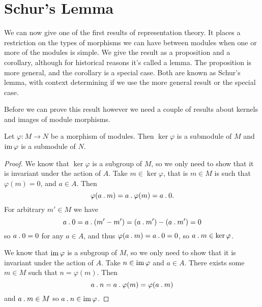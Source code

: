 \section{Schur's Lemma}
We can now give one of the first results of representation theory.
It places a restriction on the types of morphisms we can have between modules when one or more of the modules is simple.
We give the result as a proposition and a corollary, although for historical reasons it's called a lemma.
The proposition is more general, and the corollary is a special case.
Both are known as Schur's lemma, with context determining if we use the more general result or the special case.

Before we can prove this result however we need a couple of results about kernels and images of module morphisms.

\begin{lma}{}{}
    Let \(\varphi \colon M \to N\) be a morphism of modules.
    Then \(\ker \varphi\) is a submodule of \(M\) and \(\im \varphi\) is a submodule of \(N\).
    \begin{proof}
        \Step{\(\ker \varphi\)}
        We know that \(\ker \varphi\) is a subgroup of \(M\), so we only need to show that it is invariant under the action of \(A\).
        Take \(m \in \ker \varphi\), that is \(m \in M\) is such that \(\varphi(m) = 0\), and \(a \in A\).
        Then
        \begin{equation}
            \varphi(a \mathbin{.} m) = a \mathbin{.} \varphi(m) = a \mathbin{.} 0.
        \end{equation}
        For arbitrary \(m' \in M\) we have
        \begin{equation}
            a \mathbin{.} 0 = a \mathbin{.} (m' - m') = (a \mathbin{.} m') - (a \mathbin{.} m') = 0
        \end{equation}
        so \(a \mathbin{.} 0 = 0\) for any \(a \in A\), and thus \(\varphi(a \mathbin{.} m) = a \mathbin{.} 0 = 0\), so \(a \mathbin{.} m \in \ker \varphi\).
        
        \Step{\(\im \varphi\)}
        We know that \(\im \varphi\) is a subgroup of \(M\), so we only need to show that it is invariant under the action of \(A\).
        Take \(n \in \operatorname{im} \varphi\) and \(a \in A\).
        There exists some \(m \in M\) such that \(n = \varphi(m)\).
        Then
        \begin{equation}
            a \mathbin{.} n = a \mathbin{.} \varphi(m) = \varphi(a \mathbin{.} m)
        \end{equation}
        and \(a \mathbin{.} m \in M\) so \(a \mathbin{.} n \in \operatorname{im} \varphi\).
    \end{proof}
\end{lma}

